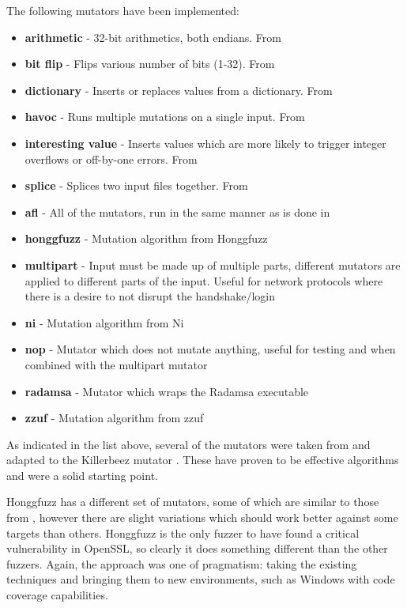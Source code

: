 The following mutators have been implemented:
\begin{itemize}[noitemsep]
\item \textbf{arithmetic} - 32-bit arithmetics, both endians. From \AFL{}
\item \textbf{bit flip} - Flips various number of bits (1-32). From \AFL{}
\item \textbf{dictionary} - Inserts or replaces values from a dictionary. From \AFL{}
\item \textbf{havoc} - Runs multiple mutations on a single input. From \AFL{}
\item \textbf{interesting value} - Inserts values which are more likely to trigger
                                   integer overflows or off-by-one errors. From
                                   \AFL{}
\item \textbf{splice} - Splices two input files together. From \AFL{}
\item \textbf{afl} - All of the \AFL{} mutators, run in the same manner as is
                     done in \AFL{}
\item \textbf{honggfuzz} - Mutation algorithm from Honggfuzz\cite{honggfuzz}
\item \textbf{multipart} - Input must be made up of multiple parts, different
                           mutators are applied to different parts of the
                           input. Useful for network protocols where there is
                           a desire to not disrupt the handshake/login
\item \textbf{ni} - Mutation algorithm from Ni\cite{ni}
\item \textbf{nop} - Mutator which does not mutate anything, useful for
                     testing and when combined with the multipart mutator
\item \textbf{radamsa} - Mutator which wraps the Radamsa\cite{radamsa} executable
\item \textbf{zzuf} - Mutation algorithm from zzuf\cite{zzuf}
\end{itemize}

As indicated in the list above, several of the mutators were taken from \AFL{}
and adapted to the Killerbeez mutator \API{}. These have proven to be effective algorithms
and were a solid starting point.

Honggfuzz has a different set of mutators, some of which are similar to those
from \AFL{}, however there are slight variations which should work better
against some targets than others.  Honggfuzz is the only fuzzer to have found a
critical vulnerability in OpenSSL,\cite{honggfuzz} so clearly it does
something different than the other fuzzers.  Again, the approach was one of pragmatism:
taking the existing techniques and bringing them to new
environments, such as Windows with code coverage capabilities.

